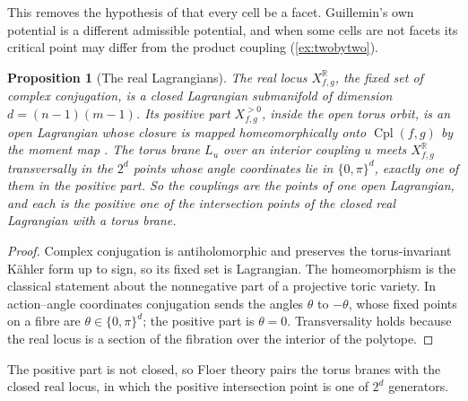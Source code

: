 \documentclass[11pt]{article}
\newtheorem{proposition}[theorem]{Proposition}
\theoremstyle{definition}
\theoremstyle{remark}
\newcommand{\R}{\mathbb{R}}
\newcommand{\Cpl}{\operatorname{Cpl}}
\begin{document}
This removes the hypothesis of \cite[Prop.~6.5]{Conditionals} that every cell be a facet. Guillemin's own potential is a
different admissible potential, and when some cells are not facets its critical point may differ from the product coupling
(\cref{ex:twobytwo}).

\begin{proposition}[The real Lagrangians]\label{prop:realpositive}
The real locus $X_{f,g}^{\R}$, the fixed set of complex conjugation, is a closed Lagrangian submanifold of dimension $d=(n-1)(m-1)$. Its
positive part $X_{f,g}^{>0}$, inside the open torus orbit, is an open Lagrangian whose closure is mapped homeomorphically onto
$\Cpl(f,g)$ by the moment map \cite{Fulton1993}. The torus brane $L_u$ over an interior coupling $u$ meets $X_{f,g}^{\R}$ transversally in the
$2^d$ points whose angle coordinates lie in $\{0,\pi\}^d$, exactly one of them in the positive part. So the couplings are the points of one
open Lagrangian, and each is the positive one of the intersection points of the closed real Lagrangian with a torus brane.
\end{proposition}
\begin{proof}
Complex conjugation is antiholomorphic and preserves the torus-invariant Kähler form up to sign, so its fixed set is Lagrangian. The
homeomorphism is the classical statement about the nonnegative part of a projective toric variety. In action--angle coordinates
conjugation sends the angles $\theta$ to $-\theta$, whose fixed points on a fibre are $\theta\in\{0,\pi\}^d$; the positive part is $\theta=0$.
Transversality holds because the real locus is a section of the fibration over the interior of the polytope.
\end{proof}

The positive part is not closed, so Floer theory pairs the torus branes with the closed real locus, in which the positive
intersection point is one of $2^d$ generators.
\end{document}
